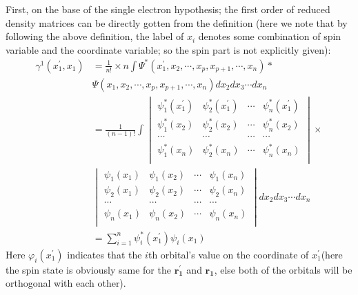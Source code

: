 First, on the base of the single electron hypothesis; the first
order of reduced density matrices can be directly gotten from the
definition (here we note that by following the above definition, the
label of $x_{i}$ denotes some combination of spin variable and the
coordinate variable; so the spin part is not explicitly given)\label{DM:1}:
\begin{align}\label{DMeq:10}
  \gamma^{1}(x^{'}_{1},x_{1})
      &= \frac{1}{n!}\times n\int \Psi^{*}(x^{'}_{1}, x_{2},
  \cdots, x_{p}, x_{p+1},
  \cdots, x_{n})* \nonumber \\
  & \Psi(x_{1}, x_{2}, \cdots, x_{p}, x_{p+1}, \cdots,
  x_{n})dx_{2}dx_{3}\cdots dx_{n} \nonumber \\
      &= \frac{1}{(n-1)!}\int \begin{vmatrix}
       \psi^{*}_{1}(x^{'}_{1}) & \psi^{*}_{2}(x^{'}_{1}) & \cdots & \psi^{*}_{n}(x^{'}_{1}) \\
       \psi^{*}_{1}(x_{2}) & \psi^{*}_{2}(x_{2}) & \cdots & \psi^{*}_{n}(x_{2}) \\
       \cdots & \cdots & \cdots & \cdots \\
       \psi^{*}_{1}(x_{n}) & \psi^{*}_{2}(x_{n}) & \cdots & \psi^{*}_{n}(x_{n}) \\
     \end{vmatrix}\times \nonumber \\
     &\begin{vmatrix}
       \psi_{1}(x_{1}) & \psi_{1}(x_{2}) & \cdots & \psi_{1}(x_{n}) \\
       \psi_{2}(x_{1}) & \psi_{2}(x_{2}) & \cdots & \psi_{2}(x_{n}) \\
       \cdots & \cdots & \cdots & \cdots \\
       \psi_{n}(x_{1}) & \psi_{n}(x_{2}) & \cdots & \psi_{n}(x_{n}) \\
     \end{vmatrix} dx_{2}dx_{3}\cdots dx_{n} \nonumber \\
  &=\sum_{i=1}^{n}\psi^{*}_{i}(x^{'}_{1})\psi_{i}(x_{1})
\end{align}
Here $\varphi_{i}(x^{'}_{1})$ indicates that the $i$th orbital's
value on the coordinate of $x^{'}_{1}$(here the spin state is
obviously same for the $\mathbf{r^{'}_{1}}$ and
$\mathbf{\bm{r_{1}}}$, else both of the orbitals will be orthogonal
with each other).

